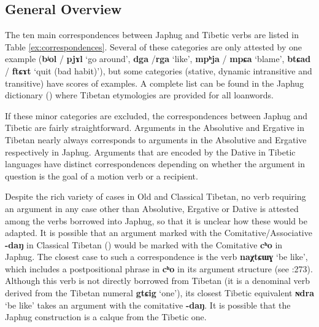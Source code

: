 \documentclass[oneside,a4paper,11pt]{article}
\newcommand{\ipa}[1]{{\phon\textbf{\mbox{#1}}}} %
\begin{document}
\subsection{General Overview}
The ten main correspondences between Japhug and Tibetic verbs are listed in Table \ref{ex:correspondences}. Several of these categories are only attested by one example (\ipa{bʲol} / \ipa{pjɤl} `go around', \ipa{dga} /\ipa{rga} `like', \ipa{mpʰja} / \ipa{mpɕa} `blame', \ipa{btɕad} / \ipa{ftɕɤt} `quit (bad habit)'), but some categories (stative, dynamic intransitive and transitive) have scores of examples. A complete list can be found in the Japhug dictionary (\citealt{jacques15japhug}) where Tibetan etymologies are provided for all loanwords.

If these minor categories are excluded, the correspondences between Japhug and Tibetic are fairly straightforward. Arguments in the Absolutive and Ergative in Tibetan nearly always corresponds to arguments in the Absolutive and Ergative respectively in Japhug. Arguments that are encoded by the Dative in Tibetic languages have distinct correspondences depending on whether the argument in question is the goal of a motion verb or a recipient.

Despite the rich variety of cases in Old and Classical Tibetan, no verb requiring an argument in any case other than Absolutive, Ergative or Dative is attested among the verbs borrowed into Japhug, so that it is unclear how these would be adapted. It is possible that an argument marked with the Comitative/Associative \ipa{-daŋ} in Classical Tibetan (\citealt{tournadre10cases, hill12bas}) would be marked with the Comitative \ipa{cʰo} in Japhug. The closest case to such a correspondence is the verb \ipa{naχtɕɯɣ} `be like', which includes a postpositional phrase in \ipa{cʰo} in its argument structure (see \citealt{jacques14linking}:273). Although this verb is not directly borrowed from Tibetan (it is a denominal verb derived from the Tibetan numeral \ipa{gtɕig} `one'), its closest Tibetic equivalent \ipa{ɴdra} `be like' takes an argument with the comitative \ipa{-daŋ}. It is possible that the Japhug construction is a calque from the Tibetic one.
\end{document}
